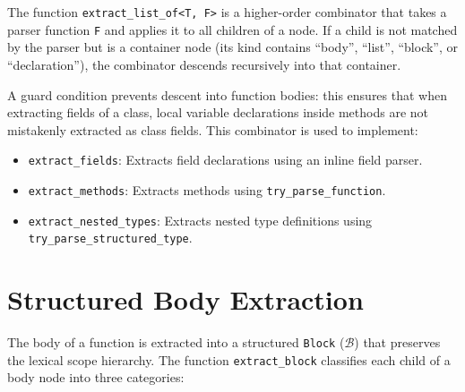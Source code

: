 The function \texttt{extract\_list\_of<T, F>} is a higher-order
combinator that takes a parser function \texttt{F} and applies it to
all children of a node. If a child is not matched by the parser but
is a container node (its kind contains ``body'', ``list'', ``block'',
or ``declaration''), the combinator descends recursively into that container.

A guard condition prevents descent into function bodies: this ensures
that when extracting fields of a class, local variable declarations
inside methods are not mistakenly extracted as class fields. This
combinator is used to implement:
\begin{itemize}
  \item \texttt{extract\_fields}: Extracts field declarations using
    an inline field parser.
  \item \texttt{extract\_methods}: Extracts methods using
    \texttt{try\_parse\_function}.
  \item \texttt{extract\_nested\_types}: Extracts nested type
    definitions using \texttt{try\_parse\_structured\_type}.
\end{itemize}

\section{Structured Body Extraction}
\label{sec:body_extraction}

The body of a function is extracted into a structured \texttt{Block}
($\mathcal{B}$) that preserves the lexical scope hierarchy. The
function \texttt{extract\_block} classifies each child of a body node
into three categories:


